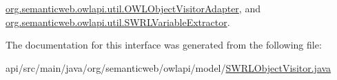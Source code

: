 \hyperlink{classorg_1_1semanticweb_1_1owlapi_1_1util_1_1_o_w_l_object_visitor_adapter_a1055ca1daf34cd3325a47fc4aa6bb59d}{org.\-semanticweb.\-owlapi.\-util.\-O\-W\-L\-Object\-Visitor\-Adapter}, and \hyperlink{classorg_1_1semanticweb_1_1owlapi_1_1util_1_1_s_w_r_l_variable_extractor_a55f4abf1d79ee13fae78ec01793cfff9}{org.\-semanticweb.\-owlapi.\-util.\-S\-W\-R\-L\-Variable\-Extractor}.



The documentation for this interface was generated from the following file\-:\begin{DoxyCompactItemize}
\item 
api/src/main/java/org/semanticweb/owlapi/model/\hyperlink{_s_w_r_l_object_visitor_8java}{S\-W\-R\-L\-Object\-Visitor.\-java}\end{DoxyCompactItemize}
